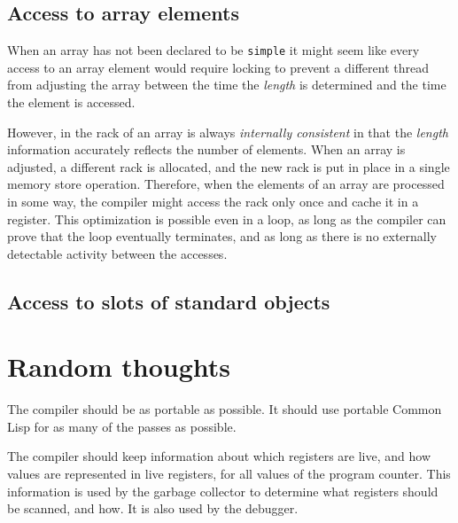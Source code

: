 \subsection{Access to array elements}

When an array has not been declared to be \texttt{simple} it might
seem like every access to an array element would require locking to
prevent a different thread from adjusting the array between the time
the \emph{length} is determined and the time the element is accessed.

However, in \sysname{} the rack of an array is always
\emph{internally consistent} in that the \emph{length} information
accurately reflects the number of elements.  When an array is
adjusted, a different rack is allocated, and the new
rack is put in place in a single memory store operation.
Therefore, when the elements of an array are processed in some way,
the compiler might access the rack only once and cache it
in a register.  This optimization is possible even in a loop, as long
as the compiler can prove that the loop eventually terminates, and as
long as there is no externally detectable activity between the
accesses.

\subsection{Access to slots of standard objects}

\section{Random thoughts}

The compiler should be as portable as possible.  It should use
portable Common Lisp for as many of the passes as possible.

The compiler should keep information about which registers are live,
and how values are represented in live registers, for all values of
the program counter.  This information is used by the garbage
collector to determine what registers should be scanned, and how.   It
is also used by the debugger.

